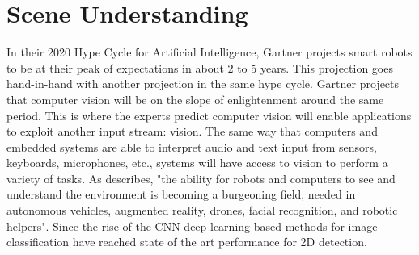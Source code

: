 

\section{Scene Understanding}\label{chap2:scene-understanding}

In their 2020 Hype Cycle for Artificial Intelligence, Gartner projects smart robots to be at their peak of expectations in about 2 to 5 years. This projection goes hand-in-hand with another projection in the same hype cycle. Gartner projects that computer vision will be on the slope of enlightenment around the same period. This is where the experts predict computer vision will enable applications to exploit another input stream: vision. The same way that computers and embedded systems are able to interpret audio and text input from sensors, keyboards, microphones, etc., systems will have access to vision to perform a variety of tasks. 
As \textcite{singh2018fotonnet} describes, "the ability for robots and computers to see and understand the environment is becoming a burgeoning field, needed in autonomous vehicles, augmented reality, drones, facial recognition, and robotic helpers". Since the rise of the CNN \cite{krizhevsky2017imagenet} deep learning based methods for image classification have reached state of the art performance for 2D detection.



